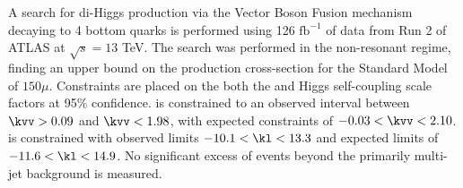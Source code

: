 A search for di-Higgs production via the Vector Boson Fusion mechanism
    decaying to 4 bottom quarks is performed using 
    126 $\textrm{fb}^{-1}$ of data from Run 2 of ATLAS at $\sqrt{s}=13$ TeV.
The search was performed in the non-resonant regime,
    finding an upper bound on the production cross-section
    for the Standard Model \vbfproc of $150\mu$.
Constraints are placed on the both the \kvv and \kl Higgs self-coupling scale factors at 95\% confidence.
\kvv is constrained to an observed interval between $\kvv > 0.09$ and $\kvv < 1.98$,
    with expected constraints of $-0.03 < \kvv < 2.10$.
\kl is constrained with observed limits $-10.1 < \kl < 13.3$ and expected limits of $-11.6 < \kl < 14.9$.
No significant excess of events beyond the primarily multi-jet background is measured.
